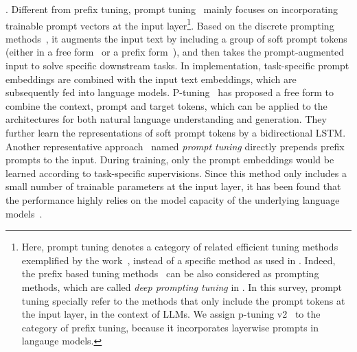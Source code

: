 . Different from prefix tuning, prompt tuning~\cite{Liu-arXiv-2021-GPT,Lester-ACL-2021-The}  mainly focuses on incorporating trainable prompt vectors at the input layer\footnote{Here, prompt tuning denotes a category of related efficient tuning methods exemplified by the work~\cite{Liu-arXiv-2021-GPT,Lester-ACL-2021-The,gu-ACL-2022-ppt}, instead of a specific method as used in \cite{Lester-ACL-2021-The}. Indeed, the prefix based tuning methods~\cite{Li-ACL-2021-prefix,Liu-arXiv-2021-P-tuning} can be also considered as prompting methods, which are called \emph{deep prompting tuning}   in \cite{Liu-arXiv-2021-P-tuning}. In this survey, prompt tuning specially refer to the methods that only include the prompt tokens at the input layer, in the context of LLMs.
We assign p-tuning v2~\cite{Liu-arXiv-2021-P-tuning} to the category of prefix tuning, because it incorporates layerwise prompts in langauge models. }. 
Based on the discrete prompting methods~\cite{jiang-TACL-2020-how,shin-EMNLP-2020-autoprompt}, it  augments the input text  by including a group of soft prompt tokens (either in a free form~\cite{Liu-arXiv-2021-GPT} or a prefix form~\cite{Lester-ACL-2021-The}), and then takes the prompt-augmented input to solve specific downstream tasks. 
In implementation, task-specific prompt embeddings are combined with the input text embeddings, which are subsequently fed into language models. P-tuning~\cite{Liu-arXiv-2021-GPT} has proposed a free form to combine the context, prompt and target tokens, which can be applied to the  architectures for both natural language understanding and generation. They further learn the representations of soft prompt tokens by a bidirectional LSTM. 
Another representative approach~\cite{Lester-ACL-2021-The}  named \emph{prompt tuning} directly prepends  prefix prompts to the input.
During training, only the prompt embeddings would be learned according to  task-specific supervisions.
Since this method only includes a small number of trainable parameters at the input layer, it has been found that the performance highly relies on the model capacity of the underlying language models~\cite{Lester-ACL-2021-The}.  




